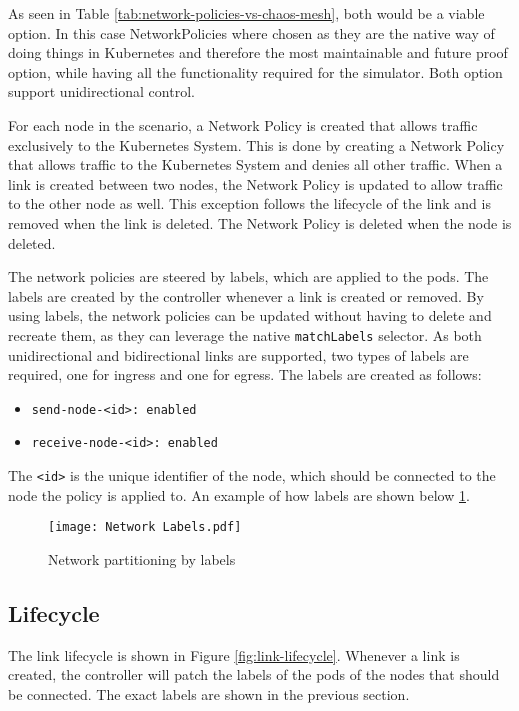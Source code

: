 As seen in Table \ref{tab:network-policies-vs-chaos-mesh}, both would be a viable option. In this case NetworkPolicies where chosen as they are the native way of doing things in Kubernetes and therefore the most maintainable and future proof option, while having all the functionality required for the simulator. Both option support unidirectional control.

For each node in the scenario, a Network Policy is created that allows traffic exclusively to the Kubernetes System.
This is done by creating a Network Policy that allows traffic to the Kubernetes System and denies all other traffic.
When a link is created between two nodes, the Network Policy is updated to allow traffic to the other node as well.
This exception follows the lifecycle of the link and is removed when the link is deleted.
The Network Policy is deleted when the node is deleted.

The network policies are steered by labels, which are applied to the pods. The labels are created by the controller whenever a link is created or removed.
By using labels, the network policies can be updated without having to delete and recreate them, as they can leverage the native \verb|matchLabels| selector.
As both unidirectional and bidirectional links are supported, two types of labels are required, one for ingress and one for egress.
The labels are created as follows:

\begin{itemize}
  \item \verb|send-node-<id>: enabled|
  \item \verb|receive-node-<id>: enabled|
\end{itemize}

The \verb|<id>| is the unique identifier of the node, which should be connected to the node the policy is applied to. An example of how labels are shown below \ref{fig:link-network-partition-labels}.

\begin{figure}[H]
  \label{fig:link-network-partition-labels}
  \caption{Network partitioning by labels}
  \centering
  \texttt{[image: Network Labels.pdf]}
\end{figure}

\subsection{Lifecycle}

The link lifecycle is shown in Figure \ref{fig:link-lifecycle}. Whenever a link is created, the controller will patch the labels of the pods of the nodes that should be connected. The exact labels are shown in the previous section.

